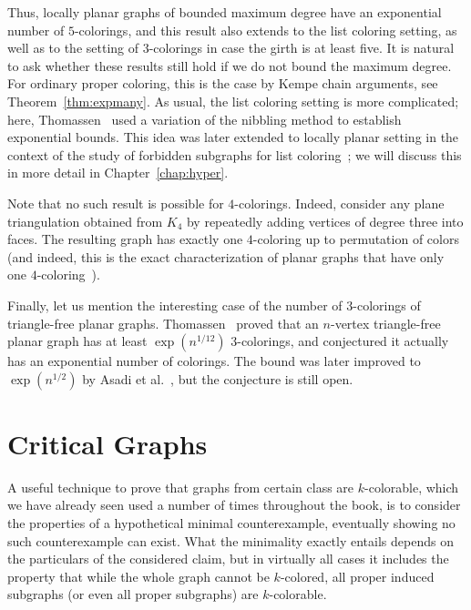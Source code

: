 \documentclass[12pt,twoside,openright,a4paper]{book}
\begin{document}
Thus, locally planar graphs of bounded maximum degree have an exponential number of $5$-colorings,
and this result also extends to the list coloring setting, as well as to the setting of $3$-colorings
in case the girth is at least five.
It is natural to ask whether these results still hold if we do not bound the maximum degree.
For ordinary proper coloring, this is the case by Kempe chain arguments, see Theorem~\ref{thm:expmany}.
As usual, the list coloring setting is more complicated; here, Thomassen~\cite{thom-2007,thom-many} used a variation
of the nibbling method to establish exponential bounds.  This idea was later extended to locally planar
setting in the context of the study of forbidden subgraphs for list coloring~\cite{PosThoHyperb};
we will discuss this in more detail in Chapter~\ref{chap:hyper}.

Note that no such result is possible for $4$-colorings.  Indeed, consider any plane triangulation obtained from
$K_4$ by repeatedly adding vertices of degree three into faces.  The resulting graph has exactly one $4$-coloring
up to permutation of colors (and indeed, this is the exact characterization of planar graphs that have
only one $4$-coloring~\cite{fowler2000unique}).

Finally, let us mention the interesting case of the number of 3-colorings of triangle-free
planar graphs.  Thomassen~\cite{thom-many} proved that an $n$-vertex triangle-free planar graph
has at least $\exp(n^{1/12})$ $3$-colorings, and conjectured it actually has an exponential number of colorings.
The bound was later improved to $\exp(n^{1/2})$ by Asadi et al.~\cite{submany}, but the conjecture is still
open.

\chapter{Critical Graphs}\label{chap:critical}

A useful technique to prove that graphs from certain class are $k$-colorable,
which we have already seen used a number of times throughout the book,
is to consider the properties of a hypothetical minimal counterexample,
eventually showing no such counterexample can exist.  What the minimality
exactly entails depends on the particulars of the considered claim, but
in virtually all cases it includes the property that while the whole graph
cannot be $k$-colored, all proper induced subgraphs (or even all proper
subgraphs) are $k$-colorable.
\end{document}
